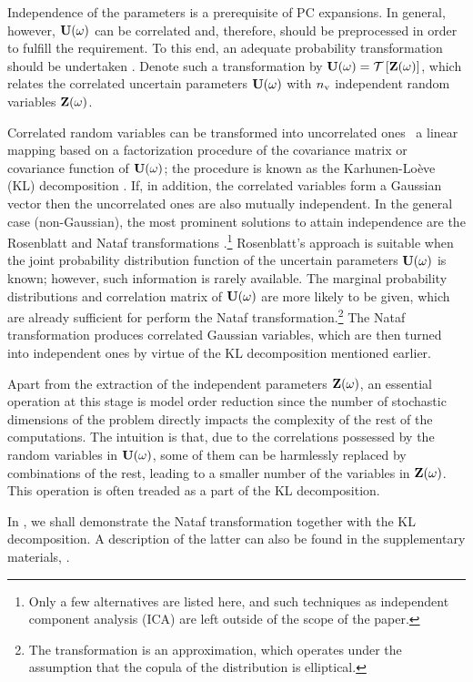 Independence of the parameters is a prerequisite of PC expansions.
In general, however, $\mathbf{U}(\omega)$ can be correlated and, therefore, should be preprocessed in order to fulfill the requirement.
To this end, an adequate probability transformation should be undertaken \cite{eldred2008}.
Denote such a transformation by $\vU(\o) = \oTransform{\vZ(\o)}$, which relates the correlated uncertain parameters $\mathbf{U}(\omega)$ with ${n_\text{v}}$ independent random variables $\mathbf{Z}(\omega)$.

Correlated random variables can be transformed into uncorrelated ones \via\ a linear mapping based on a factorization procedure of the covariance matrix or covariance function of $\mathbf{U}(\omega)$; the procedure is known as the Karhunen-Lo\`{e}ve (KL) decomposition \cite{ghanem1991}.
If, in addition, the correlated variables form a Gaussian vector then the uncorrelated ones are also mutually independent.
In the general case (non-Gaussian), the most prominent solutions to attain independence are the Rosenblatt \cite{rosenblatt1952} and Nataf transformations \cite{li2008}.\footnote{Only a few alternatives are listed here, and such techniques as independent component analysis (ICA) are left outside of the scope of the paper.}
Rosenblatt's approach is suitable when the joint probability distribution function of the uncertain parameters $\mathbf{U}(\omega)$ is known; however, such information is rarely available.
The marginal probability distributions and correlation matrix of $\mathbf{U}(\omega)$ are more likely to be given, which are already sufficient for perform the Nataf transformation.\footnote{The transformation is an approximation, which operates under the assumption that the copula of the distribution is elliptical.}
The Nataf transformation produces correlated Gaussian variables, which are then turned into independent ones by virtue of the KL decomposition mentioned earlier.

Apart from the extraction of the independent parameters $\mathbf{Z}(\omega)$, an essential operation at this stage is model order reduction since the number of stochastic dimensions of the problem directly impacts the complexity of the rest of the computations.
The intuition is that, due to the correlations possessed by the random variables in $\mathbf{U}(\omega)$, some of them can be harmlessly replaced by combinations of the rest, leading to a smaller number of the variables in $\mathbf{Z}(\omega)$.
This operation is often treaded as a part of the KL decomposition.

In , we shall demonstrate the Nataf transformation together with the KL decomposition.
A description of the latter can also be found in the supplementary materials, .
